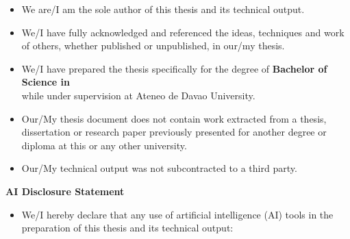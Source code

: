 \documentclass[11pt,letterpaper]{article}
\newif\iffilled
\begin{document}
\begin{itemize}[leftmargin=1.5em, itemsep=1.0pt, topsep=0pt]
  \iffilled
    \item We are the sole authors of this thesis and its technical output.
    \item We have fully acknowledged and referenced the ideas, techniques and work of others, whether published or unpublished, in our thesis.
    \item We have prepared the thesis specifically for the degree of \textbf{Bachelor of Science in Computer Science} while under supervision at Ateneo de Davao University.
    \item Our thesis document does not contain work extracted from a thesis, dissertation or research paper previously presented for another degree or diploma at this or any other university.
    \item Our technical output was not subcontracted to a third party.
  \else
    \item We are/I am the sole author of this thesis and its technical output.
    \item We/I have fully acknowledged and referenced the ideas, techniques and work of others, whether published or unpublished, in our/my thesis.
    \item We/I have prepared the thesis specifically for the degree of \textbf{Bachelor of Science in}\\[2pt]
    \underline{\hspace{5.5cm}} while under supervision at Ateneo de Davao University.
    \item Our/My thesis document does not contain work extracted from a thesis, dissertation or research paper previously presented for another degree or diploma at this or any other university.
    \item Our/My technical output was not subcontracted to a third party.
  \fi
\end{itemize}

\vspace{0.08cm}

{\fontsize{11pt}{14pt}\selectfont \textbf{AI Disclosure Statement}\par}

\vspace{0.04cm}
\begin{itemize}[leftmargin=1.5em, itemsep=1pt, topsep=0pt]
  \iffilled
    \item We hereby declare that any use of artificial intelligence (AI) tools in the preparation of this thesis and its technical output:
  \else
    \item We/I hereby declare that any use of artificial intelligence (AI) tools in the preparation of this thesis and its technical output:
  \fi
\end{itemize}
\end{document}
